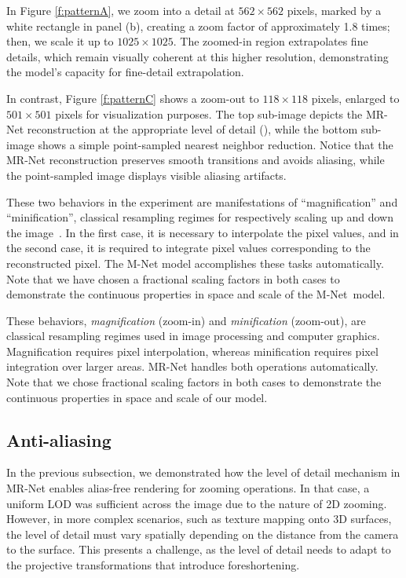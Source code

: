 In Figure \ref{f:patternA}, we zoom into a detail at \(562 \times 562\) pixels, marked by a white rectangle in panel (b), creating a zoom factor of approximately 1.8 times; then, we scale it up to \(1025 \times 1025\). The zoomed-in region extrapolates fine details, which remain visually coherent at this higher resolution, demonstrating the model's capacity for fine-detail extrapolation.

In contrast, Figure \ref{f:patternC} shows a zoom-out to \(118 \times 118\) pixels, enlarged to \(501 \times 501\) pixels for visualization purposes. The top sub-image depicts the MR-Net reconstruction at the appropriate level of detail (), while the bottom sub-image shows a simple point-sampled nearest neighbor reduction. Notice that the MR-Net reconstruction preserves smooth transitions and avoids aliasing, while the point-sampled image displays visible aliasing artifacts.

These two behaviors in the experiment are manifestations of ``magnification'' and ``minification'', classical resampling regimes for respectively scaling up and down the image~\cite{pixel}. In the first case, it is necessary to interpolate the pixel values, and in the second case, it is required to integrate pixel values corresponding to the reconstructed pixel. The M-Net model accomplishes these tasks automatically.
Note that we have chosen a fractional scaling factors in both cases to demonstrate the continuous properties in space and scale of the M-Net~model.

These behaviors, \textit{magnification} (zoom-in) and \textit{minification} (zoom-out), are classical resampling regimes used in image processing \cite{pixel} and computer graphics. Magnification requires pixel interpolation, whereas minification requires pixel integration over larger areas. MR-Net handles both operations automatically. Note that we chose fractional scaling factors in both cases to demonstrate the continuous properties in space and scale of our model.

\subsection{Anti-aliasing}

In the previous subsection, we demonstrated how the level of detail mechanism in MR-Net enables alias-free rendering for zooming operations. In that case, a uniform LOD was sufficient across the image due to the nature of 2D zooming. However, in more complex scenarios, such as texture mapping onto 3D surfaces, the level of detail must vary spatially depending on the distance from the camera to the surface. This presents a challenge, as the level of detail needs to adapt to the projective transformations that introduce foreshortening.

